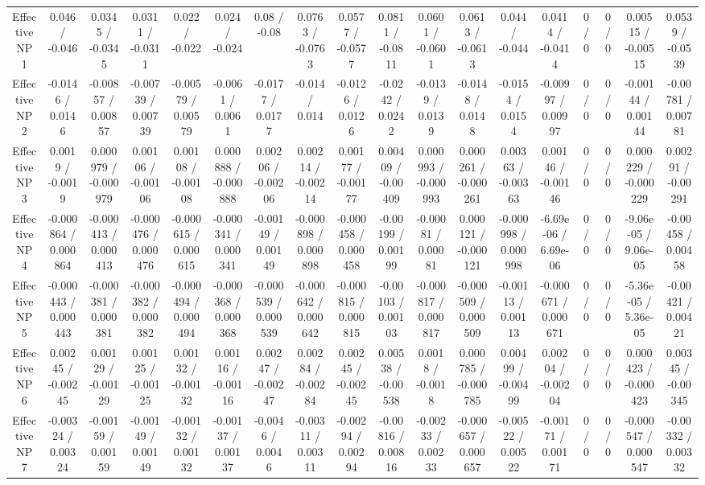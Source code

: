 \documentclass[10pt]{article}
\begin{document}
\begin{table}[htbp]
\begin{center}
\begin{tabular}{|c|c|c|c|c|c|c|c|c|c|c|c|c|c|c|c|c|c|}
  Effective NP 1 & 0.046 / -0.046 & 0.0345 / -0.0345 & 0.0311 / -0.0311 & 0.022 / -0.022 & 0.024 / -0.024 & 0.08 / -0.08 & 0.0763 / -0.0763 & 0.0577 / -0.0577 & 0.0811 / -0.0811 & 0.0601 / -0.0601 & 0.0613 / -0.0613 & 0.044 / -0.044 & 0.0414 / -0.0414 & 0 / 0 & 0 / 0 & 0.00515 / -0.00515 & 0.0539 / -0.0539 \\ 
  Effective NP 2 & -0.0146 / 0.0146 & -0.00857 / 0.00857 & -0.00739 / 0.00739 & -0.00579 / 0.00579 & -0.0061 / 0.0061 & -0.0177 / 0.0177 & -0.014 / 0.014 & -0.0126 / 0.0126 & -0.0242 / 0.0242 & -0.0139 / 0.0139 & -0.0148 / 0.0148 & -0.0154 / 0.0154 & -0.00997 / 0.00997 & 0 / 0 & 0 / 0 & -0.00144 / 0.00144 & -0.00781 / 0.00781 \\ 
  Effective NP 3 & 0.0019 / -0.0019 & 0.000979 / -0.000979 & 0.00106 / -0.00106 & 0.00108 / -0.00108 & 0.000888 / -0.000888 & 0.00206 / -0.00206 & 0.00214 / -0.00214 & 0.00177 / -0.00177 & 0.00409 / -0.00409 & 0.000993 / -0.000993 & 0.000261 / -0.000261 & 0.00363 / -0.00363 & 0.00146 / -0.00146 & 0 / 0 & 0 / 0 & 0.000229 / -0.000229 & 0.00291 / -0.00291 \\ 
  Effective NP 4 & -0.000864 / 0.000864 & -0.000413 / 0.000413 & -0.000476 / 0.000476 & -0.000615 / 0.000615 & -0.000341 / 0.000341 & -0.00149 / 0.00149 & -0.000898 / 0.000898 & -0.000458 / 0.000458 & -0.00199 / 0.00199 & -0.00081 / 0.00081 & 0.000121 / -0.000121 & -0.000998 / 0.000998 & -6.69e-06 / 6.69e-06 & 0 / 0 & 0 / 0 & -9.06e-05 / 9.06e-05 & -0.00458 / 0.00458 \\ 
  Effective NP 5 & -0.000443 / 0.000443 & -0.000381 / 0.000381 & -0.000382 / 0.000382 & -0.000494 / 0.000494 & -0.000368 / 0.000368 & -0.000539 / 0.000539 & -0.000642 / 0.000642 & -0.000815 / 0.000815 & -0.00103 / 0.00103 & -0.000817 / 0.000817 & -0.000509 / 0.000509 & -0.00113 / 0.00113 & -0.000671 / 0.000671 & 0 / 0 & 0 / 0 & -5.36e-05 / 5.36e-05 & -0.00421 / 0.00421 \\ 
  Effective NP 6 & 0.00245 / -0.00245 & 0.00129 / -0.00129 & 0.00125 / -0.00125 & 0.00132 / -0.00132 & 0.00116 / -0.00116 & 0.00247 / -0.00247 & 0.00284 / -0.00284 & 0.00245 / -0.00245 & 0.00538 / -0.00538 & 0.0018 / -0.0018 & 0.000785 / -0.000785 & 0.00499 / -0.00499 & 0.00204 / -0.00204 & 0 / 0 & 0 / 0 & 0.000423 / -0.000423 & 0.00345 / -0.00345 \\ 
  Effective NP 7 & -0.00324 / 0.00324 & -0.00159 / 0.00159 & -0.00149 / 0.00149 & -0.00132 / 0.00132 & -0.00137 / 0.00137 & -0.0046 / 0.0046 & -0.00311 / 0.00311 & -0.00294 / 0.00294 & -0.00816 / 0.00816 & -0.00233 / 0.00233 & -0.000657 / 0.000657 & -0.00522 / 0.00522 & -0.00171 / 0.00171 & 0 / 0 & 0 / 0 & -0.000547 / 0.000547 & -0.00332 / 0.00332 \\ 

\end{tabular}
\end{center}
\end{table}
\end{document}
